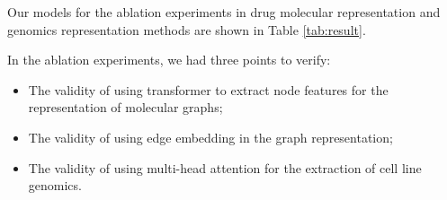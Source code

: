 \documentclass{article}
\begin{document}
\begin{table}[htbp]
\caption{Ablation experiments for TransEDRP. }
\renewcommand\arraystretch{1.2}
\centering
{}

\label{tab:result}
\end{table}

Our models for the ablation experiments in drug molecular representation  and genomics representation methods are shown in Table \ref{tab:result}. 

In the ablation experiments, we had three points to verify: 


\begin{itemize}
\item The validity of using transformer to extract node features for the representation of molecular graphs;
\item The validity of using edge embedding in the graph representation;
\item The validity of using multi-head attention for the extraction of cell line genomics.
\end{itemize} 
\end{document}
